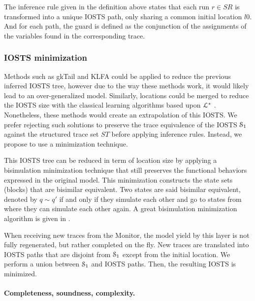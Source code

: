 The inference rule given in the definition above states that each
run $r \in SR$ is transformed into a unique IOSTS path, only
sharing a common initial location $l0$. And for each path, the
guard is defined as the conjunction of the assignments of the
variables found in the corresponding trace.

\subsubsection{IOSTS minimization}

Methods such as gkTail and KLFA could be applied to reduce the
previous inferred IOSTS tree, however due to the way these
methods work, it would likely lead to an over-generalized model.
Similarly, locations could be merged to reduce the IOSTS size
with the classical learning algorithms based upon
$\EuScript{L}^*$ \cite{Angluin198787,lambeau08}. Nonetheless,
these methods would create an extrapolation of this IOSTS. We
prefer rejecting such solutions to preserve the trace equivalence
\cite{petrenko06} of the IOSTS $\EuScript{S}_1$ against the
structured trace set $ST$ before applying inference rules.
Instead, we propose to use a minimization technique.

This IOSTS tree can be reduced in term of location size by
applying a bisimulation minimization technique
\cite{Park:1981:CAI:647210.720030} that still preserves the
functional behaviors expressed in the original model.  This
minimization constructs the state sets (blocks) that are
bisimilar equivalent. Two states are said bisimilar equivalent,
denoted by $q \sim q'$ if and only if they simulate each other
and go to states from where they can simulate each other again.
A great bisimulation minimization algorithm is given in
\cite{Fernandez89animplementation}.

When receiving new traces from the Monitor, the model yield by
this layer is not fully regenerated, but rather completed on the
fly. New traces are translated into IOSTS paths that are disjoint
from $\EuScript{S}_1$ except from the initial location. We
perform a union between $\EuScript{S}_1$ and IOSTS paths. Then,
the resulting IOSTS is minimized.

\paragraph{Completeness, soundness, complexity.}

